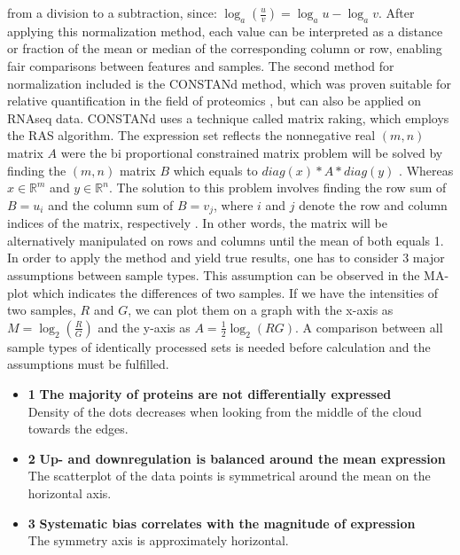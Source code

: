\documentclass[
  11pt,
]{article}
\begin{document}
from a division to a subtraction, since:
\(\log_a \left(\frac{u}{v}\right)=\log_a u-\log_a v\). After applying
this normalization method, each value can be interpreted as a distance
or fraction of the mean or median of the corresponding column or row,
enabling fair comparisons between features and samples. The second
method for normalization included is the CONSTANd method, which was
proven suitable for relative quantification in the field of proteomics
\citep{Maes2016, VanHoutven2021}, but can also be applied on RNAseq
data. CONSTANd uses a technique called matrix raking, which employs the
RAS algorithm. The expression set reflects the nonnegative real
\((m, n)\) matrix \(A\) were the bi proportional constrained matrix
problem will be solved by finding the \((m, n)\) matrix \(B\) which
equals to \(diag(x) * A *diag(y)\) . Whereas \(x \in \mathbb{R}^{m}\)
and \(y \in \mathbb{R}^{n}\). The solution to this problem involves
finding the row sum of \(B=u_i\) and the column sum of \(B=v_j\), where
\(i\) and \(j\) denote the row and column indices of the matrix,
respectively \citep{Bacharach1965}. In other words, the matrix will be
alternatively manipulated on rows and columns until the mean of both
equals 1. In order to apply the method and yield true results, one has
to consider 3 major assumptions between sample types. This assumption
can be observed in the MA-plot which indicates the differences of two
samples. If we have the intensities of two samples, \(R\) and \(G\), we
can plot them on a graph with the x-axis as \(M=\log_2(\frac{R}{G})\)
and the y-axis as \(A=\frac{1}{2}\log_2(RG)\). A comparison between all
sample types of identically processed sets is needed before calculation
and the assumptions must be fulfilled.

\begin{itemize}
\item{\textbf{1}} \textbf{The majority of proteins are not differentially expressed}
\\Density of the dots decreases when looking from the middle of the cloud towards the edges.

\item{\textbf{2}} \textbf{Up- and downregulation is balanced around the mean expression}
\\The scatterplot of the data points is symmetrical around the mean on the horizontal axis. 

\item{\textbf{3}} \textbf{Systematic bias correlates with the magnitude of expression}
\\The symmetry axis is approximately horizontal.

\end{itemize}
\end{document}
